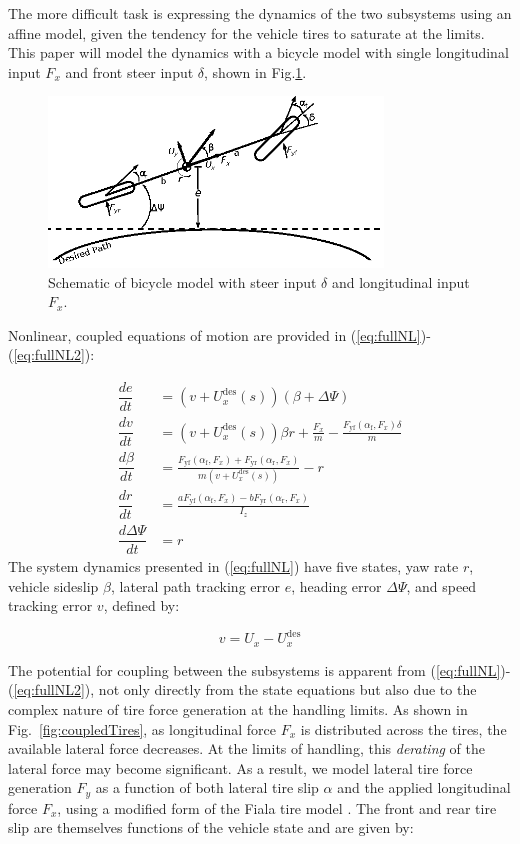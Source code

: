 \documentclass[9pt,shortpaper,twoside,web]{ieeecolor}
\begin{document}
{{{The more difficult task is expressing the dynamics of the two subsystems using an affine model, given the tendency for the vehicle tires to saturate at the limits. This paper will model the dynamics with a bicycle model with single longitudinal input $F_x$ and front steer input $\delta$, shown in Fig.\ref{fig:bikemodel}.

\begin{figure}[h]
\centering
\includegraphics[width=3.5in]{figures/BikeModelSchematic.eps}
\caption{Schematic of bicycle model with steer input $\delta$ and longitudinal input $F_x$.}
\label{fig:bikemodel}
\end{figure}


Nonlinear, coupled equations of motion are provided in (\ref{eq:fullNL})-(\ref{eq:fullNL2}):

\begin{align}
\label{eq:fullNL}
	\dfrac{de}{dt} &= \left(v+U^\mathrm{des}_x(s)\right)(\beta + \Delta\Psi) \\
	\dfrac{dv}{dt} &= \left(v+U^\mathrm{des}_x(s)\right)\beta r + \frac{F_x}{m} - \frac{F_\mathrm{yf}(\alpha_\mathrm{f},F_x)\delta}{m}\\
	\dfrac{d\beta}{dt} &= \frac{F_\mathrm{yf}(\alpha_\mathrm{f}, F_x) + F_\mathrm{yr}(\alpha_\mathrm{r},F_x)}{m\left(v + U^\mathrm{des}_x(s)\right)}-r \\
	\dfrac{dr}{dt}     &= \frac{aF_\mathrm{yf}(\alpha_\mathrm{f}, F_x) - bF_\mathrm{yr}(\alpha_\mathrm{r}, F_x)}{I_z} \\
	\dfrac{d\Delta\Psi}{dt} &= r \label{eq:fullNL2}
\end{align}
The system dynamics presented in (\ref{eq:fullNL}) have five states, yaw rate $r$, vehicle sideslip $\beta$, lateral path tracking error $e$, heading error $\Delta \Psi$, and speed tracking error $v$, defined by:

\begin{equation}
v = U_x - U^\mathrm{des}_x
\end{equation}

The potential for coupling between the subsystems is apparent from  (\ref{eq:fullNL})-(\ref{eq:fullNL2}), not only directly from the state equations but also due to the complex nature of tire force generation at the handling limits. As shown in Fig.~\ref{fig:coupledTires}, as longitudinal
force $F_x$ is distributed across the tires, the available lateral force decreases. At the limits of handling, this
\textit{derating} of the lateral force may become significant. As a result, we model lateral tire force generation $F_y$ as a function
of both lateral tire slip $\alpha$ and the applied longitudinal force $F_x$, using a modified form of the Fiala tire model \cite{rami}. The front and rear tire slip are themselves functions of the vehicle state and are given by: 

}}}
\end{document}
